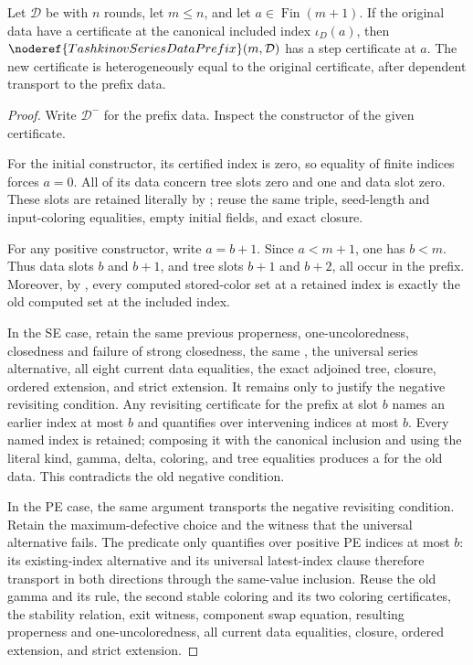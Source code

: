 \begin{lemma}
Let \(\mathcal D\) be  with \(n\) rounds, let
\(m\leq n\), and let \(a\in\operatorname{Fin}(m+1)\).  If the original data
have a  certificate at the canonical included
index \(\iota_D(a)\), then
\(\noderef{TashkinovSeriesDataPrefix}(m,\mathcal D)\) has a step certificate
at \(a\).  The new certificate is heterogeneously equal to the original
certificate, after dependent transport to the prefix data.
\end{lemma}
\begin{proof}
Write \(\mathcal D^-\) for the prefix data.  Inspect the constructor of the
given  certificate.

For the initial constructor, its certified index is zero, so equality of
finite indices forces \(a=0\).  All of its data concern tree slots zero and
one and data slot zero.  These slots are retained literally by
; reuse the same triple, seed-length and
input-coloring equalities, empty initial fields, and exact closure.

For any positive constructor, write \(a=b+1\).  Since \(a<m+1\), one has
\(b<m\).  Thus data slots \(b\) and \(b+1\), and tree slots \(b+1\) and
\(b+2\), all occur in the prefix.  Moreover, by
, every computed stored-color set at a
retained index is exactly the old computed set at the included index.

In the SE case, retain the same previous properness, one-uncoloredness,
closedness and failure of strong closedness, the same
, the universal series alternative, all eight
current data equalities, the exact adjoined tree, closure, ordered extension,
and strict extension.  It remains only to justify the negative revisiting
condition.  Any revisiting certificate for the prefix at slot \(b\) names an
earlier index at most \(b\) and quantifies over intervening indices at most
\(b\).  Every named index is retained; composing it with the canonical
inclusion and using the literal kind, gamma, delta, coloring, and tree
equalities produces a  for the old
data.  This contradicts the old negative condition.

In the PE case, the same argument transports the negative revisiting
condition.  Retain the maximum-defective choice and the witness that the
universal alternative fails.  The predicate
 only quantifies over positive PE indices at
most \(b\): its existing-index alternative and its universal latest-index
clause therefore transport in both directions through the same-value
inclusion.  Reuse the old gamma and its rule, the second stable coloring and
its two coloring certificates, the stability relation, exit witness, component
swap equation, resulting properness and one-uncoloredness, all current data
equalities, closure, ordered extension, and strict extension.


\end{proof}
